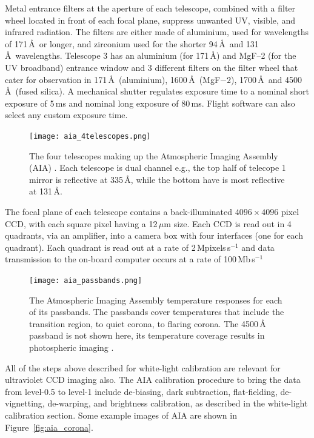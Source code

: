 Metal entrance filters at the aperture of each telescope, combined with a filter wheel located in front of each focal plane, suppress unwanted UV, visible, and infrared radiation. The filters are either made of aluminium, used for wavelengths of 171\,\AA~or longer, and zirconium used for the shorter 94\,\AA~and 131\,\AA~wavelengths. Telescope 3 has an aluminium (for 171\,\AA) and MgF--2 (for the UV broadband) entrance window and 3 different filters on the filter wheel that cater for observation in 171\,\AA~(aluminium), 1600\,\AA~(MgF$-2$), 1700\,\AA~and 4500\,\AA~(fused silica). A mechanical shutter regulates exposure time to a nominal short exposure of 5\,ms and nominal long exposure of 80\,ms. Flight software can also select any custom exposure time.
\begin{figure}[!t]
\begin{center}
\texttt{[image: aia\_4telescopes.png]}
\caption[The four telescopes of AIA]{The four telescopes making up the Atmospheric Imaging Assembly (AIA) \citep{lemen2012}. Each telescope is dual channel e.g., the top half of telecope 1 mirror is reflective at 335\,\AA, while the bottom have is most reflective at 131\,\AA.}
\label{fig:aia_four_tel}
\end{center}
\end{figure}
The focal plane of each telescope contains a back-illuminated $4096\times4096$ pixel CCD, with each square pixel having a 12\,$\mu$m size. Each CCD is read out in 4 quadrants, via an amplifier, into a camera box with four interfaces (one for each quadrant). Each quadrant is read out at a rate of 2\,Mpixels\,s$^{-1}$ and data transmission to the on-board computer occurs at a rate of 100\,Mb\,s$^{-1}$
\begin{figure}[!t]
\begin{center}
\texttt{[image: aia\_passbands.png]}
\caption[AIA temperature response]{The Atmospheric Imaging Assembly temperature responses for each of its passbands. The passbands cover temperatures that include the transition region, to quiet corona, to flaring corona. The 4500\,\AA~ passband is not shown here, its temperature coverage results in photospheric imaging \citep{lemen2012}.}
\label{fig:aia_pass}
\end{center}
\end{figure}
All of the steps above described for white-light calibration are relevant for ultraviolet CCD imaging also. The AIA calibration procedure to bring the data from level-0.5 to level-1 include de-biasing, dark subtraction, flat-fielding, de-vignetting, de-warping, and brightness calibration, as described in the white-light calibration section. Some example images of AIA are shown in Figure~\ref{fig:aia_corona}.

